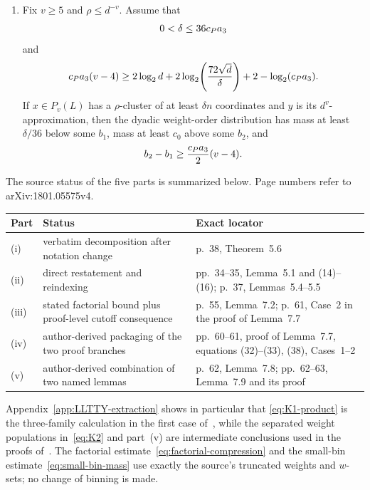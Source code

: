 \begin{proposition}
\begin{enumerate}[label=\textup{(\roman*)}]
\item Fix $v\ge5$ and $\rho\le d^{-v}$. Assume that
\begin{equation}\label{eq:Pv-delta}
  0<\delta\le36c_P a_3
\end{equation}
and
\begin{equation}\label{eq:Pv-separation-hyp}
  c_P a_3(v-4)
  \ge2\log_2d+2\log_2\!\left(\frac{72\sqrt d}{\delta}\right)
     +2-\log_2(c_P a_3).
\end{equation}
If $x\in P_v(L)$ has a $\rho$-cluster of at least $\delta n$ coordinates and $y$ is its $d^v$-approximation, then the dyadic weight-order distribution has mass at least $\delta/36$ below some $b_1$, mass at least $c_0$ above some $b_2$, and
\begin{equation}\label{eq:Pv-separation}
  b_2-b_1\ge\frac{c_P a_3}{2}(v-4).
\end{equation}
\end{enumerate}
\end{proposition}

The source status of the five parts is summarized below. Page numbers refer to arXiv:1801.05575v4.
\begin{center}
\small
\begin{tabular}{p{}p{}p{}}
\toprule
Part & Status & Exact locator\\
\midrule
(i) & verbatim decomposition after notation change & p.~38, Theorem~5.6\\
(ii) & direct restatement and reindexing & pp.~34--35, Lemma~5.1 and (14)--(16); p.~37, Lemmas~5.4--5.5\\
(iii) & stated factorial bound plus proof-level cutoff consequence & p.~55, Lemma~7.2; p.~61, Case~2 in the proof of Lemma~7.7\\
(iv) & author-derived packaging of the two proof branches & pp.~60--61, proof of Lemma~7.7, equations (32)--(33), (38), Cases~1--2\\
(v) & author-derived combination of two named lemmas & p.~62, Lemma~7.8; pp.~62--63, Lemma~7.9 and its proof\\
\bottomrule
\end{tabular}
\end{center}

\begin{remark}\label{rem:source-map-package}
Appendix~\ref{app:LLTTY-extraction} shows in particular that \eqref{eq:K1-product} is the three-family calculation in the first case of~\cite[Lemma~7.7]{LLTTY19}, while the separated weight populations in~\eqref{eq:K2} and part~(v) are intermediate conclusions used in the proofs of~\cite[Lemmas~7.7 and 7.9]{LLTTY19}. The factorial estimate~\eqref{eq:factorial-compression} and the small-bin estimate~\eqref{eq:small-bin-mass} use exactly the source's truncated weights and $w$-sets; no change of binning is made.
\end{remark}

